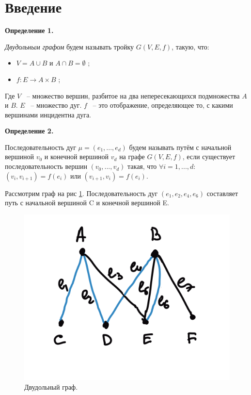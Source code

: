 \documentclass[14pt]{mmcs-article}
\begin{document}
\section*{Введение}

\textbf{Определение 1.}


\textsl{Двудольным графом} будем называть тройку $ G(V, E, f)$, такую, что:

\begin{itemize}
    \item $V = A \cup B$ и $A \cap B = \emptyset$ ;
    \item $f: E \rightarrow A \times B$ ;
\end{itemize}

Где $V$ ~-- множество вершин, разбитое на два непересекающихся подмножества $A$ и $B$.
$E$ ~-- множество дуг.
$f$ ~-- это отображение, определяющее то, с какими вершинами инцидентна дуга.

\textbf{Определение 2.}

Последовательность дуг $\mu = (e_1, ..., e_d)$ будем называть путём с начальной вершиной $v_0$ и конечной вершиной $v_d$  на графе $G(V,E,f)$, если существует последовательность вершин $(v_0, ..., v_d)$ такая, что $\forall i = 1,...,d:$ $(v_i, v_{i+1}) = f(e_i)$ или $(v_{i+1}, v_i) = f(e_i)$. 


Рассмотрим граф на рис \ref{image:1}. Последовательность дуг $(e_1, e_2, e_4, e_6)$ составляет путь с начальной вершиной C и конечной вершиной E.

\begin{figure}[H]
    \centering
    \includegraphics[scale=1.0]{path_example.png}
    \caption{ Двудольный граф. }\label{image:1}
\end{figure}
\end{document}
